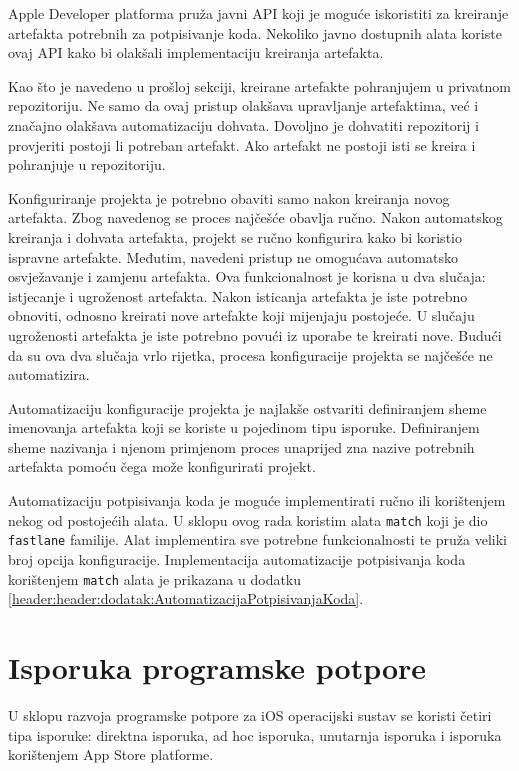 \documentclass[times, utf8, diplomski, numeric]{fer}
\begin{document}
Apple Developer platforma pruža javni API koji je moguće iskoristiti za kreiranje artefakta potrebnih za potpisivanje koda. Nekoliko javno dostupnih alata koriste ovaj API kako bi olakšali implementaciju kreiranja artefakta.

Kao što je navedeno u prošloj sekciji, kreirane artefakte pohranjujem u privatnom repozitoriju. Ne samo da ovaj pristup olakšava upravljanje artefaktima, već i značajno olakšava automatizaciju dohvata. Dovoljno je dohvatiti repozitorij i provjeriti postoji li potreban artefakt. Ako artefakt ne postoji isti se kreira i pohranjuje u repozitoriju.

Konfiguriranje projekta je potrebno obaviti samo nakon kreiranja novog artefakta. Zbog navedenog se proces najčešće obavlja ručno. Nakon automatskog kreiranja i dohvata artefakta, projekt se ručno konfigurira kako bi koristio ispravne artefakte. Međutim, navedeni pristup ne omogućava automatsko osvježavanje i zamjenu artefakta. Ova funkcionalnost je korisna u dva slučaja: istjecanje i ugroženost artefakta. Nakon isticanja artefakta je iste potrebno obnoviti, odnosno kreirati nove artefakte koji mijenjaju postojeće. U slučaju ugroženosti artefakta je iste potrebno povući iz uporabe te kreirati nove. Budući da su ova dva slučaja vrlo rijetka, procesa konfiguracije projekta se najčešće ne automatizira.

Automatizaciju konfiguracije projekta je najlakše ostvariti definiranjem sheme imenovanja artefakta koji se koriste u pojedinom tipu isporuke. Definiranjem sheme nazivanja i njenom primjenom proces unaprijed zna nazive potrebnih artefakta pomoću čega može konfigurirati projekt.

Automatizaciju potpisivanja koda je moguće implementirati ručno ili korištenjem nekog od postojećih alata. U sklopu ovog rada koristim alata \verb|match| koji je dio \verb|fastlane| familije. Alat implementira sve potrebne funkcionalnosti te pruža veliki broj opcija konfiguracije. Implementacija automatizacije potpisivanja koda korištenjem \verb|match| alata je prikazana u dodatku \ref{header:header:dodatak:AutomatizacijaPotpisivanjaKoda}.

\section{Isporuka programske potpore} \label{header:RucnaIsporuka}

U sklopu razvoja programske potpore za iOS operacijski sustav se koristi četiri tipa isporuke: direktna isporuka, ad hoc isporuka, unutarnja isporuka i isporuka korištenjem App Store platforme.
\end{document}
